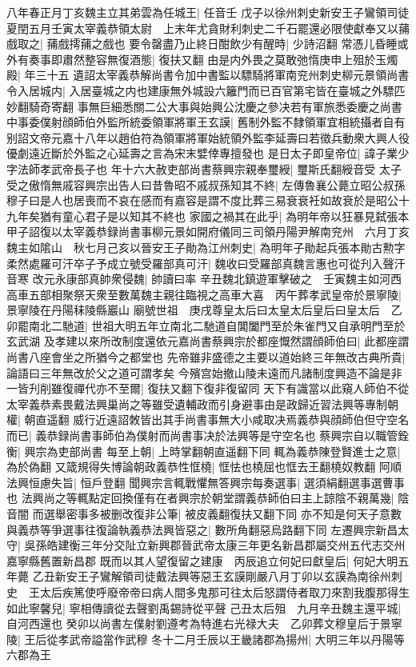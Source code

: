 八年春正月丁亥魏主立其弟雲為任城王|{
	任音壬}
戊子以徐州刺史新安王子鸞領司徒夏閏五月壬寅太宰義恭領太尉　上末年尤貪財利刺史二千石罷還必限使獻奉又以蒱戲取之|{
	蒱戲摴蒱之戲也}
要令罄盡乃止終日酣飲少有醒時|{
	少詩沼翻}
常憑儿昏睡或外有奏事即肅然整容無復酒態|{
	復扶又翻}
由是内外畏之莫敢弛惰庚申上殂於玉燭殿|{
	年三十五}
遺詔太宰義恭解尚書令加中書監以驃騎將軍南兖州刺史柳元景領尚書令入居城内|{
	入居臺城之内也建康無外城設六籬門而已百官第宅皆在臺城之外驃匹妙翻騎奇寄翻}
事無巨細悉關二公大事與始興公沈慶之參决若有軍旅悉委慶之尚書中事委僕射顔師伯外監所統委領軍將軍王玄謨|{
	舊制外監不隸領軍宜相統攝者自有别詔文帝元嘉十八年以趙伯符為領軍將軍始統領外監李延壽曰若徵兵動衆大興人役優劇遠近斷於外監之心延壽之言為宋末嬖倖專擅發也}
是日太子即皇帝位|{
	諱子業少字法師孝武帝長子也}
年十六大赦吏部尚書蔡興宗親奉璽綬|{
	璽斯氏翻綬音受}
太子受之傲惰無戚容興宗出告人曰昔魯昭不戚叔孫知其不終|{
	左傳魯襄公薨立昭公叔孫穆子曰是人也居喪而不哀在感而有嘉容是謂不度比葬三易衰衰衽如故衰於是昭公十九年矣猶有童心君子是以知其不終也}
家國之禍其在此乎|{
	為明年帝以狂暴見弑張本}
甲子詔復以太宰義恭録尚書事柳元景如開府儀同三司領丹陽尹解南兖州　六月丁亥魏主如隂山　秋七月己亥以晉安王子勛為江州刺史|{
	為明年子勛起兵張本勛古勲字}
柔然處羅可汗卒子予成立號受羅部真可汗|{
	魏收曰受羅部真魏言惠也可從刋入聲汗音寒}
改元永康部真帥衆侵魏|{
	帥讀曰率}
辛丑魏北鎮遊軍擊破之　壬寅魏主如河西高車五部相聚祭天衆至數萬魏主親往臨視之高車大喜　丙午葬孝武皇帝於景寧陵|{
	景寧陵在丹陽秣陵縣巖山}
廟號世祖　庚戌尊皇太后曰太皇太后皇后曰皇太后　乙卯罷南北二馳道|{
	世祖大明五年立南北二馳道自閶闔門至於朱雀門又自承明門至於玄武湖}
及孝建以來所改制度還依元嘉尚書蔡興宗於都座慨然謂顔師伯曰|{
	此都座謂尚書八座會坐之所猶今之都堂也}
先帝雖非盛德之主要以道始終三年無改古典所貴|{
	論語曰三年無改於父之道可謂孝矣}
今殯宫始撤山陵未遠而凡諸制度興造不論是非一皆刋削雖復禪代亦不至爾|{
	復扶又翻下復非復留同}
天下有識當以此窺人師伯不從太宰義恭素畏戴法興巢尚之等雖受遺輔政而引身避事由是政歸近習法興等專制朝權|{
	朝直遥翻}
威行近遠詔敇皆出其手尚書事無大小咸取决焉義恭與顔師伯但守空名而已|{
	義恭録尚書事師伯為僕射而尚書事决於法興等是守空名也}
蔡興宗自以職管銓衡|{
	興宗為吏部尚書}
每至上朝|{
	上時掌翻朝直遥翻下同}
輒為義恭陳登賢進士之意|{
	為於偽翻}
又箴規得失博論朝政義恭性恇橈|{
	恇怯也橈屈也恇去王翻橈奴教翻}
阿順法興恒慮失旨|{
	恒戶登翻}
聞興宗言輒戰懼無答興宗每奏選事|{
	選須絹翻選事選曹事也}
法興尚之等輒點定回換僅有在者興宗於朝堂謂義恭師伯曰主上諒陰不親萬幾|{
	陰音闇}
而選舉密事多被删改復非公筆|{
	被皮義翻復扶又翻下同}
亦不知是何天子意數與義恭等爭選事往復論執義恭法興皆惡之|{
	數所角翻惡烏路翻下同}
左遷興宗新昌太守|{
	吳孫皓建衡三年分交阯立新興郡晉武帝太康三年更名新昌郡屬交州五代志交州嘉寧縣舊置新昌郡}
既而以其人望復留之建康　丙辰追立何妃曰獻皇后|{
	何妃大明五年薨}
乙丑新安王子鸞解領司徒戴法興等惡王玄謨剛嚴八月丁卯以玄謨為南徐州刺史　王太后疾篤使呼廢帝帝曰病人間多鬼那可往太后怒謂侍者取刀來割我腹那得生如此寧馨兒|{
	寧相傳讀從去聲劉禹錫詩從平聲}
己丑太后殂　九月辛丑魏主還平城|{
	自河西還也}
癸卯以尚書左僕射劉遵考為特進右光禄大夫　乙卯葬文穆皇后于景寧陵|{
	王后從孝武帝謚當作武穆}
冬十二月壬辰以王畿諸郡為揚州|{
	大明三年以丹陽等六郡為王}


